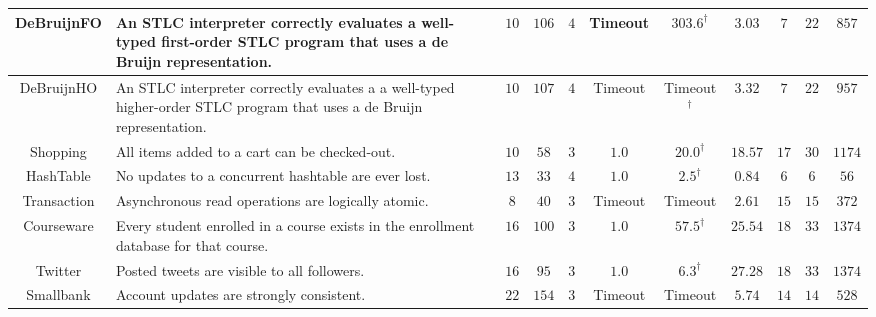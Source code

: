 \begin{table}[t!]
\begin{tabular}{c|P{4.8cm}||ccc||cc||c|ccc}
\midrule
\textsf{DeBruijnFO}\cite{CoverageType} & {\scriptsize An STLC interpreter correctly evaluates a
  well-typed first-order STLC program that uses a de Bruijn representation.} & $10$ & $106$ & $4$ & {\tiny Timeout} & $303.6^{\dagger}$ & $3.03$ & $7$ & $22$ & $857$\\
\midrule
\textsf{DeBruijnHO}\cite{CoverageType} & {\scriptsize An STLC interpreter correctly evaluates a
  a well-typed higher-order STLC program that uses a de Bruijn representation.} & $10$ & $107$ & $4$ & {\tiny Timeout} & {\tiny Timeout}$^{\dagger}$ & $3.32$ & $7$ & $22$ & $957$\\
\midrule
\midrule
\textsf{Shopping}\cite{MonkeyDB} & {\scriptsize All items added to a cart can be checked-out.} & $10$ & $58$ & $3$ & $1.0$ & $20.0^{\dagger}$ & $18.57$ & $17$ & $30$ & $1174$\\
\midrule
\textsf{HashTable}\cite{OcamlMulticorePBT} & {\scriptsize No updates to a concurrent hashtable are ever lost.} & $13$ & $33$ & $4$ & $1.0$ & $2.5^{\dagger}$ & $0.84$ & $6$ & $6$ & $56$\\
\midrule
\textsf{Transaction} & {\scriptsize Asynchronous read operations are logically atomic.} & $8$ & $40$ & $3$ & {\tiny Timeout} & {\tiny Timeout} & $2.61$ & $15$ & $15$ & $372$\\
\midrule
\textsf{Courseware}\cite{MonkeyDB} & {\scriptsize Every student enrolled in a course exists in the
  enrollment database for that course.} & $16$ & $100$ & $3$ & $1.0$ & $57.5^{\dagger}$ & $25.54$ & $18$ & $33$ & $1374$\\
\midrule
\textsf{Twitter}\cite{MonkeyDB} & {\scriptsize Posted tweets are visible to all followers.} & $16$ & $95$ & $3$ & $1.0$ & $6.3^{\dagger}$ & $27.28$ & $18$ & $33$ & $1374$\\
\midrule
\textsf{Smallbank}\cite{OLTPBench} & {\scriptsize Account updates are strongly consistent.} & $22$ & $154$ & $3$ & {\tiny Timeout} & {\tiny Timeout} & $5.74$ & $14$ & $14$ & $528$\\
\bottomrule
\end{tabular}
\label{tab:evaluation-rich}
\vspace*{-.15in}
\end{table}


